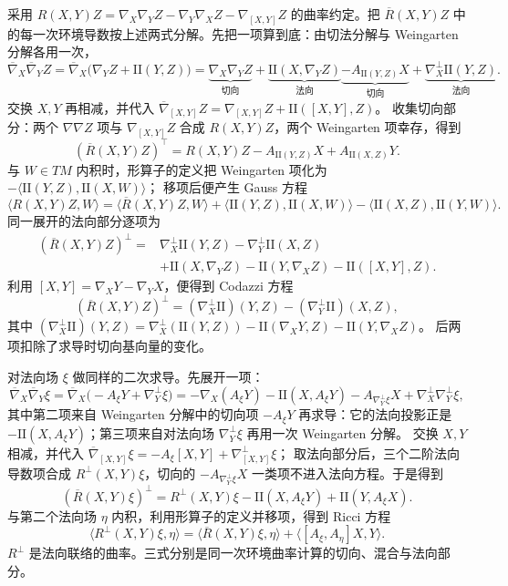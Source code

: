 采用 \(R(X,Y)Z=\nabla_X\nabla_YZ-\nabla_Y\nabla_XZ-\nabla_{[X,Y]}Z\) 的曲率约定。把 \(\overline R(X,Y)Z\) 中的每一次环境导数按上述两式分解。先把一项算到底：由切法分解与 Weingarten 分解各用一次，
\[
\overline\nabla_X\overline\nabla_YZ
=\overline\nabla_X\bigl(\nabla_YZ+\mathrm{II}(Y,Z)\bigr)
=\underbrace{\nabla_X\nabla_YZ}_{\text{切向}}
+\underbrace{\mathrm{II}(X,\nabla_YZ)}_{\text{法向}}
\underbrace{-A_{\mathrm{II}(Y,Z)}X}_{\text{切向}}
+\underbrace{\nabla_X^\perp\mathrm{II}(Y,Z)}_{\text{法向}}.
\]
交换 \(X,Y\) 再相减，并代入
\(\overline\nabla_{[X,Y]}Z=\nabla_{[X,Y]}Z+\mathrm{II}([X,Y],Z)\)。
收集切向部分：两个 \(\nabla\nabla Z\) 项与 \(\nabla_{[X,Y]}Z\)
合成 \(R(X,Y)Z\)，两个 Weingarten 项幸存，得到
\[
(\overline R(X,Y)Z)^\top
=R(X,Y)Z-A_{\mathrm{II}(Y,Z)}X+A_{\mathrm{II}(X,Z)}Y.
\]
与 \(W\in TM\) 内积时，形算子的定义把 Weingarten 项化为
\(-\langle\mathrm{II}(Y,Z),\mathrm{II}(X,W)\rangle\)；
移项后便产生 Gauss 方程
\begin{equation}
\label{eq:math-gauss-compatibility}
\langle R(X,Y)Z,W\rangle
=\langle\overline R(X,Y)Z,W\rangle
+\langle\mathrm{II}(Y,Z),\mathrm{II}(X,W)\rangle
-\langle\mathrm{II}(X,Z),\mathrm{II}(Y,W)\rangle .
\end{equation}
同一展开的法向部分逐项为
\[
\begin{aligned}
(\overline R(X,Y)Z)^\perp
={}&\nabla_X^\perp\mathrm{II}(Y,Z)-\nabla_Y^\perp\mathrm{II}(X,Z)\\
&+\mathrm{II}(X,\nabla_YZ)-\mathrm{II}(Y,\nabla_XZ)
-\mathrm{II}([X,Y],Z).
\end{aligned}
\]
利用 \([X,Y]=\nabla_XY-\nabla_YX\)，便得到 Codazzi 方程
\[
(\overline R(X,Y)Z)^\perp
=(\nabla_X^\perp\mathrm{II})(Y,Z)
 -(\nabla_Y^\perp\mathrm{II})(X,Z),
\]
其中
\((\nabla_X^\perp\mathrm{II})(Y,Z)=\nabla_X^\perp(\mathrm{II}(Y,Z))
-\mathrm{II}(\nabla_XY,Z)-\mathrm{II}(Y,\nabla_XZ)\)。
后两项扣除了求导时切向基向量的变化。

对法向场 \(\xi\) 做同样的二次求导。先展开一项：
\[
\overline\nabla_X\overline\nabla_Y\xi
=\overline\nabla_X\bigl(-A_\xi Y+\nabla_Y^\perp\xi\bigr)
=-\nabla_X(A_\xi Y)-\mathrm{II}(X,A_\xi Y)
-A_{\nabla_Y^\perp\xi}X+\nabla_X^\perp\nabla_Y^\perp\xi ,
\]
其中第二项来自 Weingarten 分解中的切向项
\(-A_\xi Y\) 再求导：它的法向投影正是
\(-\mathrm{II}(X,A_\xi Y)\)；第三项来自对法向场
\(\nabla_Y^\perp\xi\) 再用一次 Weingarten 分解。
交换 \(X,Y\) 相减，并代入
\(\overline\nabla_{[X,Y]}\xi=-A_\xi[X,Y]+\nabla^\perp_{[X,Y]}\xi\)；
取法向部分后，三个二阶法向导数项合成
\(R^\perp(X,Y)\xi\)，切向的 \(-A_{\nabla_Y^\perp\xi}X\)
一类项不进入法向方程。于是得到
\[
(\overline R(X,Y)\xi)^\perp
=R^\perp(X,Y)\xi-\mathrm{II}(X,A_\xi Y)
+\mathrm{II}(Y,A_\xi X).
\]
与第二个法向场 \(\eta\) 内积，利用形算子的定义并移项，得到 Ricci 方程
\[
\langle R^\perp(X,Y)\xi,\eta\rangle
=\langle\overline R(X,Y)\xi,\eta\rangle
+\langle[A_\xi,A_\eta]X,Y\rangle .
\]
\(R^\perp\) 是法向联络的曲率。三式分别是同一次环境曲率计算的切向、混合与法向部分。

